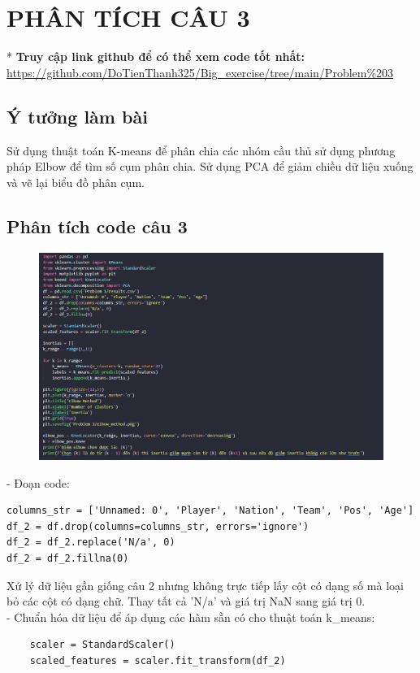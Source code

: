 \section{PHÂN TÍCH CÂU 3}
\setcounter{section}{3}
* \textbf{Truy cập link github để có thể xem code tốt nhất:}  \url{https://github.com/DoTienThanh325/Big_exercise/tree/main/Problem%203}
\subsection{Ý tưởng làm bài}
Sử dụng thuật toán K-means để phân chia các nhóm cầu thủ sử dụng phương pháp Elbow để tìm số cụm phân chia. Sử dụng PCA để giảm chiều dữ liệu xuống và vẽ lại biểu đồ phân cụm.
\subsection{Phân tích code câu 3}
\begin{figure}[H]
    \centering
    \includegraphics[width=1\linewidth]{img/3_1.png}
\end{figure}
- Đoạn code: 
\begin{verbatim}
columns_str = ['Unnamed: 0', 'Player', 'Nation', 'Team', 'Pos', 'Age']
df_2 = df.drop(columns=columns_str, errors='ignore')
df_2 = df_2.replace('N/a', 0)
df_2 = df_2.fillna(0)   
\end{verbatim}
Xứ lý dữ liệu gần giống câu 2 nhưng không trực tiếp lấy cột có dạng số mà loại bỏ các cột có dạng chữ. Thay tất cả 'N/a' và giá trị NaN sang giá trị 0.\\
- Chuẩn hóa dữ liệu để áp dụng các hàm sẵn có cho thuật toán k\_means:
\begin{verbatim}
    scaler = StandardScaler()
    scaled_features = scaler.fit_transform(df_2)
\end{verbatim}
